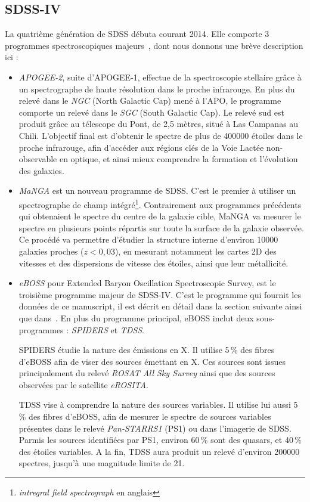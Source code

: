 \documentclass[11pt, twoside, a4paper, openright]{report}
\begin{document}
\subsection{SDSS-IV}

La quatrième génération de SDSS débuta courant 2014. Elle comporte 3 programmes spectroscopiques majeurs~\cite{Blanton2017}, dont nous donnons une brève description ici :
\begin{itemize}
\item \emph{APOGEE-2}, suite d'APOGEE-1, effectue de la spectroscopie stellaire grâce à un spectrographe de haute résolution dans le proche infrarouge. En plus du relevé dans le \emph{NGC} (North Galactic Cap) mené à l'APO, le programme comporte un relevé dans le \emph{SGC} (South Galactic Cap). Le relevé sud est produit grâce au télescope du Pont, de 2,5 mètres, situé à Las Campanas au Chili. L'objectif final est d'obtenir le spectre de plus de \num{400000} étoiles dans le proche infrarouge, afin d'accéder aux régions clés de la Voie Lactée non-observable en optique, et ainsi mieux comprendre la formation et l'évolution des galaxies.
\item \emph{MaNGA} est un nouveau programme de SDSS. C'est le premier à utiliser un spectrographe de champ intégré\footnote{\emph{intregral field spectrograph} en anglais}. Contrairement aux programmes précédents qui obtenaient le spectre du centre de la galaxie cible, MaNGA va mesurer le spectre en plusieurs points répartis sur toute la surface de la galaxie observée. Ce procédé va permettre d'étudier la structure interne d'environ \num{10000} galaxies proches ($z < 0,03$), en mesurant notamment les cartes 2D des vitesses et des dispersions de vitesse des étoiles, ainsi que leur  métallicité.
\item \emph{eBOSS} pour Extended Baryon Oscillation Spectroscopic Survey, est le troisième programme majeur de SDSS-IV. C'est le programme qui fournit les données de ce manuscript, il est décrit en détail dans la section suivante ainsi que dans~\cite{Dawson2015}. En plus du programme principal, eBOSS inclut deux sous-programmes : \emph{SPIDERS} et \emph{TDSS}.
  
  SPIDERS étudie la nature des émissions en X. Il utilise 5\,\% des fibres d'eBOSS afin de viser des sources émettant en X. Ces sources sont issues principalement du relevé \emph{ROSAT All Sky Survey} ainsi que des sources observées par le satellite \emph{eROSITA}.

  TDSS vise à comprendre la nature des sources variables. Il utilise lui aussi 5\,\% des fibres d'eBOSS, afin de mesurer le spectre de sources variables présentes dans le relevé \emph{Pan-STARRS1} (PS1) ou dans l'imagerie de SDSS. Parmis les sources identifiées par PS1, environ 60\,\% sont des quasars, et 40\,\% des étoiles variables. A la fin, TDSS aura produit un relevé d'environ \num{200000} spectres, jusqu'à une magnitude limite de 21.
\end{itemize}
\end{document}
